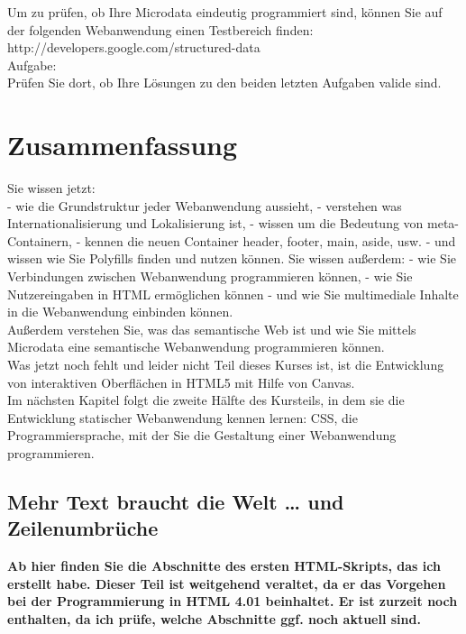 Um zu prüfen, ob Ihre Microdata eindeutig programmiert sind, können Sie auf der folgenden Webanwendung einen Testbereich finden:\\

http://developers.google.com/structured-data  \\

Aufgabe:\\

Prüfen Sie dort, ob Ihre Lösungen zu den beiden letzten Aufgaben valide sind.

\section{Zusammenfassung}

Sie wissen jetzt:\\

-	wie die Grundstruktur jeder Webanwendung aussieht,
-	verstehen was Internationalisierung und Lokalisierung ist,
-	wissen um die Bedeutung von meta-Containern,
-	kennen die neuen Container header, footer, main, aside, usw.
-	und wissen wie Sie Polyfills finden und nutzen können.
Sie wissen außerdem:
-	wie Sie Verbindungen zwischen Webanwendung programmieren können,
-	wie Sie Nutzereingaben in HTML ermöglichen können
-	und wie Sie multimediale Inhalte in die Webanwendung einbinden können.\\

Außerdem verstehen Sie, was das semantische Web ist und wie Sie mittels Microdata eine semantische Webanwendung programmieren können.\\

Was jetzt noch fehlt und leider nicht Teil dieses Kurses ist, ist die Entwicklung von interaktiven Oberflächen in HTML5 mit Hilfe von Canvas.\\

Im nächsten Kapitel folgt die zweite Hälfte des Kursteils, in dem sie die Entwicklung statischer Webanwendung kennen lernen: CSS, die Programmiersprache, mit der Sie die Gestaltung einer Webanwendung programmieren.

\subsection{Mehr Text braucht die Welt … und Zeilenumbrüche}

\textbf{Ab hier finden Sie die Abschnitte des ersten HTML-Skripts, das ich erstellt habe. Dieser Teil ist weitgehend veraltet, da er das Vorgehen bei der Programmierung in HTML 4.01 beinhaltet. Er ist zurzeit noch enthalten, da ich prüfe, welche Abschnitte ggf. noch aktuell sind.}\\

